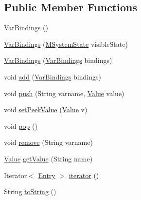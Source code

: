 \subsection*{Public Member Functions}
\begin{DoxyCompactItemize}
\item 
\hyperlink{classorg_1_1tzi_1_1use_1_1uml_1_1ocl_1_1value_1_1_var_bindings_ad92a06517db2b2142a6e3c1e062ca587}{Var\-Bindings} ()
\item 
\hyperlink{classorg_1_1tzi_1_1use_1_1uml_1_1ocl_1_1value_1_1_var_bindings_a57bf79edc446f497c68c11d139151693}{Var\-Bindings} (\hyperlink{classorg_1_1tzi_1_1use_1_1uml_1_1sys_1_1_m_system_state}{M\-System\-State} visible\-State)
\item 
\hyperlink{classorg_1_1tzi_1_1use_1_1uml_1_1ocl_1_1value_1_1_var_bindings_a1a1add81f24afabb422be77e9cc73c0b}{Var\-Bindings} (\hyperlink{classorg_1_1tzi_1_1use_1_1uml_1_1ocl_1_1value_1_1_var_bindings}{Var\-Bindings} bindings)
\item 
void \hyperlink{classorg_1_1tzi_1_1use_1_1uml_1_1ocl_1_1value_1_1_var_bindings_a18d8f47fdfa2985c25f8459816130f49}{add} (\hyperlink{classorg_1_1tzi_1_1use_1_1uml_1_1ocl_1_1value_1_1_var_bindings}{Var\-Bindings} bindings)
\item 
void \hyperlink{classorg_1_1tzi_1_1use_1_1uml_1_1ocl_1_1value_1_1_var_bindings_aec5fea86e5f6e236314d1f91c3cbc49b}{push} (String varname, \hyperlink{classorg_1_1tzi_1_1use_1_1uml_1_1ocl_1_1value_1_1_value}{Value} value)
\item 
void \hyperlink{classorg_1_1tzi_1_1use_1_1uml_1_1ocl_1_1value_1_1_var_bindings_a01ded44b6386e0b8e534b315673a3856}{set\-Peek\-Value} (\hyperlink{classorg_1_1tzi_1_1use_1_1uml_1_1ocl_1_1value_1_1_value}{Value} v)
\item 
void \hyperlink{classorg_1_1tzi_1_1use_1_1uml_1_1ocl_1_1value_1_1_var_bindings_a33fbc17360346e01e099f599a760f0cc}{pop} ()
\item 
void \hyperlink{classorg_1_1tzi_1_1use_1_1uml_1_1ocl_1_1value_1_1_var_bindings_a2c35682bab78eb232960973466e669d7}{remove} (String varname)
\item 
\hyperlink{classorg_1_1tzi_1_1use_1_1uml_1_1ocl_1_1value_1_1_value}{Value} \hyperlink{classorg_1_1tzi_1_1use_1_1uml_1_1ocl_1_1value_1_1_var_bindings_a3e344bf5d701fb63328754e3c8ff1cd5}{get\-Value} (String name)
\item 
Iterator$<$ \hyperlink{classorg_1_1tzi_1_1use_1_1uml_1_1ocl_1_1value_1_1_var_bindings_1_1_entry}{Entry} $>$ \hyperlink{classorg_1_1tzi_1_1use_1_1uml_1_1ocl_1_1value_1_1_var_bindings_a8e43c644b8dd0a540f703d961be5cb92}{iterator} ()
\item 
String \hyperlink{classorg_1_1tzi_1_1use_1_1uml_1_1ocl_1_1value_1_1_var_bindings_a16258e11f34f2976df5fe12ea196be99}{to\-String} ()
\end{DoxyCompactItemize}


